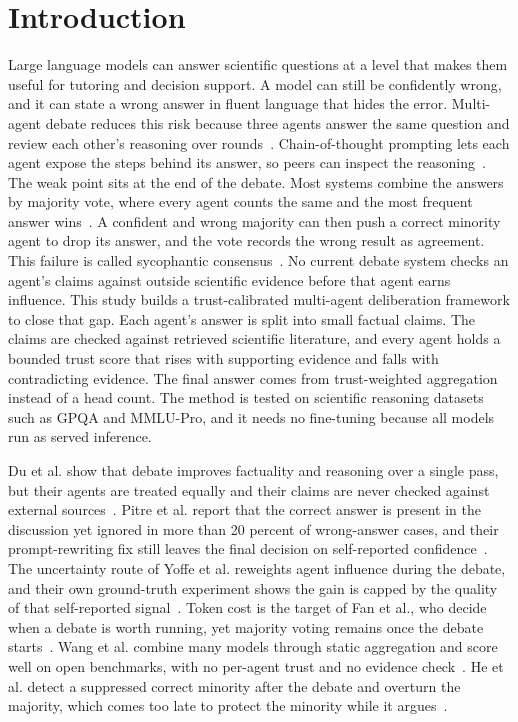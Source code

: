 \section{Introduction}

Large language models can answer scientific questions at a level that makes them useful for tutoring and decision support. A model can still be confidently wrong, and it can state a wrong answer in fluent language that hides the error. Multi-agent debate reduces this risk because three agents answer the same question and review each other's reasoning over rounds~\cite{du2024improving}. Chain-of-thought prompting lets each agent expose the steps behind its answer, so peers can inspect the reasoning~\cite{wei2022chain}. The weak point sits at the end of the debate. Most systems combine the answers by majority vote, where every agent counts the same and the most frequent answer wins~\cite{wang-etal-2024-rethinking-bounds,choi2025debate}. A confident and wrong majority can then push a correct minority agent to drop its answer, and the vote records the wrong result as agreement. This failure is called sycophantic consensus~\cite{pitre-etal-2025-consensagent,he2026minority}. No current debate system checks an agent's claims against outside scientific evidence before that agent earns influence. This study builds a trust-calibrated multi-agent deliberation framework to close that gap. Each agent's answer is split into small factual claims. The claims are checked against retrieved scientific literature, and every agent holds a bounded trust score that rises with supporting evidence and falls with contradicting evidence. The final answer comes from trust-weighted aggregation instead of a head count. The method is tested on scientific reasoning datasets such as GPQA and MMLU-Pro, and it needs no fine-tuning because all models run as served inference.

Du et al. show that debate improves factuality and reasoning over a single pass, but their agents are treated equally and their claims are never checked against external sources~\cite{du2024improving}. Pitre et al. report that the correct answer is present in the discussion yet ignored in more than 20 percent of wrong-answer cases, and their prompt-rewriting fix still leaves the final decision on self-reported confidence~\cite{pitre-etal-2025-consensagent}. The uncertainty route of Yoffe et al. reweights agent influence during the debate, and their own ground-truth experiment shows the gain is capped by the quality of that self-reported signal~\cite{yoffe-etal-2025-debunc}. Token cost is the target of Fan et al., who decide when a debate is worth running, yet majority voting remains once the debate starts~\cite{fan2026imad}. Wang et al. combine many models through static aggregation and score well on open benchmarks, with no per-agent trust and no evidence check~\cite{wang2025mixture}. He et al. detect a suppressed correct minority after the debate and overturn the majority, which comes too late to protect the minority while it argues~\cite{he2026minority}.

